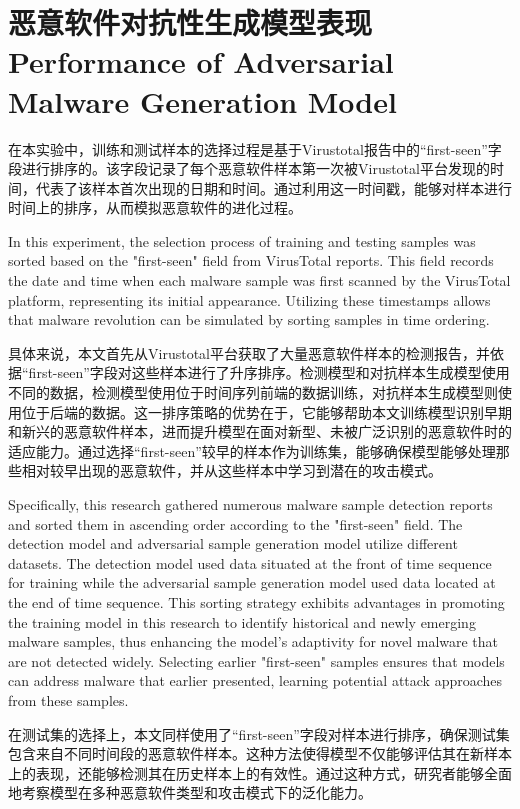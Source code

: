 \section{恶意软件对抗性生成模型表现 Performance of Adversarial Malware Generation Model}

在本实验中，训练和测试样本的选择过程是基于Virustotal报告中的“first-seen”字段进行排序的。该字段记录了每个恶意软件样本第一次被Virustotal平台发现的时间，代表了该样本首次出现的日期和时间。通过利用这一时间戳，能够对样本进行时间上的排序，从而模拟恶意软件的进化过程。

In this experiment, the selection process of training and testing samples was sorted based on the "first-seen" field from VirusTotal reports. This field records the date and time when each malware sample was first scanned by the VirusTotal platform, representing its initial appearance. Utilizing these timestamps allows that malware revolution can be simulated by sorting samples in time ordering.

具体来说，本文首先从Virustotal平台获取了大量恶意软件样本的检测报告，并依据“first-seen”字段对这些样本进行了升序排序。检测模型和对抗样本生成模型使用不同的数据，检测模型使用位于时间序列前端的数据训练，对抗样本生成模型则使用位于后端的数据。这一排序策略的优势在于，它能够帮助本文训练模型识别早期和新兴的恶意软件样本，进而提升模型在面对新型、未被广泛识别的恶意软件时的适应能力。通过选择“first-seen”较早的样本作为训练集，能够确保模型能够处理那些相对较早出现的恶意软件，并从这些样本中学习到潜在的攻击模式。

Specifically, this research gathered numerous malware sample detection reports and sorted them in ascending order according to the "first-seen" field. The detection model and adversarial sample generation model utilize different datasets. The detection model used data situated at the front of time sequence for training while the adversarial sample generation model used data located at the end of time sequence. This sorting strategy exhibits advantages in promoting the training model in this research to identify historical and newly emerging malware samples, thus enhancing the model's adaptivity for novel malware that are not detected widely. Selecting earlier "first-seen" samples ensures that models can address malware that earlier presented, learning potential attack approaches from these samples.

在测试集的选择上，本文同样使用了“first-seen”字段对样本进行排序，确保测试集包含来自不同时间段的恶意软件样本。这种方法使得模型不仅能够评估其在新样本上的表现，还能够检测其在历史样本上的有效性。通过这种方式，研究者能够全面地考察模型在多种恶意软件类型和攻击模式下的泛化能力。

